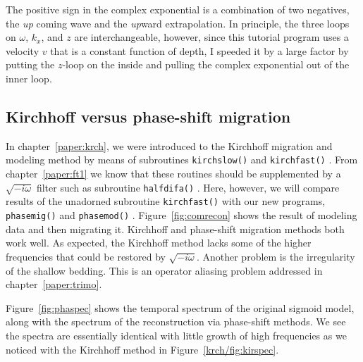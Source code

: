 \par
The positive sign in the complex exponential is a combination of two negatives,
the {\em  up}
coming wave and the {\em  up}ward extrapolation.
In principle,
the three loops on  $\omega$, $k_x$, and  $z$  are interchangeable,
however, since this tutorial program uses
a velocity $v$ that is a constant function of depth,
I speeded it by a large factor by putting the $z$-loop on the inside
and pulling the complex exponential out of the inner loop.

\subsection{Kirchhoff versus phase-shift migration}
In chapter~\ref{paper:krch}, we were introduced to the Kirchhoff
migration and modeling method by means of subroutines
\texttt{kirchslow()}  and \texttt{kirchfast()} .
From chapter~\ref{paper:ft1} we know that these routines should be
supplemented by a $\sqrt{-i\omega}$
filter such as subroutine \texttt{halfdifa()} .
Here, however,
we will compare results of the unadorned subroutine \texttt{kirchfast()} 
with our new programs, \texttt{phasemig()}  and \texttt{phasemod()} .
Figure~\ref{fig:comrecon} shows the result of modeling data and then migrating it.
Kirchhoff and phase-shift migration methods both work well.
As expected, the Kirchhoff method lacks some of the higher frequencies
that could be restored by $\sqrt{-i\omega}$.
Another problem is the irregularity of the shallow bedding.
This is an operator aliasing problem
addressed in chapter~\ref{paper:trimo}.


Figure~\ref{fig:phaspec} shows the temporal spectrum of the original sigmoid model,
along with the spectrum of the reconstruction via phase-shift methods.
We see the spectra are essentially identical
with little growth of high frequencies
as we noticed with the Kirchhoff method
in Figure~\ref{krch/fig:kirspec}.

